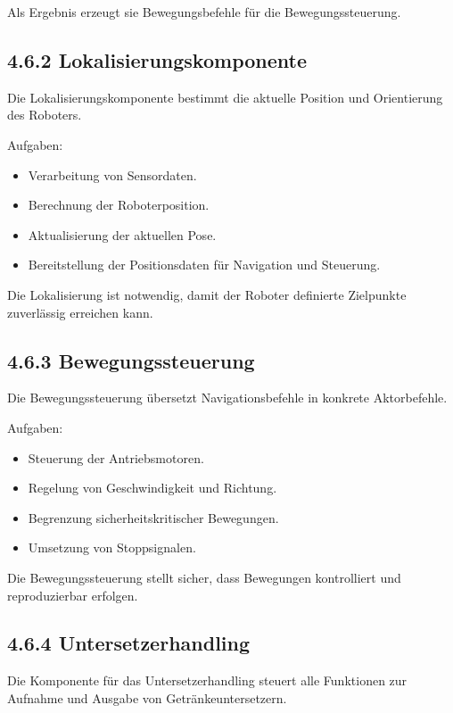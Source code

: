 \documentclass[
]{article}
\providecommand{\tightlist}{%
  \setlength{\itemsep}{0pt}\setlength{\parskip}{0pt}}
\begin{document}
Als Ergebnis erzeugt sie Bewegungsbefehle für die Bewegungssteuerung.

\subsection{4.6.2
Lokalisierungskomponente}\label{lokalisierungskomponente-1}

Die Lokalisierungskomponente bestimmt die aktuelle Position und
Orientierung des Roboters.

Aufgaben:

\begin{itemize}
\tightlist
\item
  Verarbeitung von Sensordaten.
\item
  Berechnung der Roboterposition.
\item
  Aktualisierung der aktuellen Pose.
\item
  Bereitstellung der Positionsdaten für Navigation und Steuerung.
\end{itemize}

Die Lokalisierung ist notwendig, damit der Roboter definierte Zielpunkte
zuverlässig erreichen kann.

\subsection{4.6.3 Bewegungssteuerung}\label{bewegungssteuerung-1}

Die Bewegungssteuerung übersetzt Navigationsbefehle in konkrete
Aktorbefehle.

Aufgaben:

\begin{itemize}
\tightlist
\item
  Steuerung der Antriebsmotoren.
\item
  Regelung von Geschwindigkeit und Richtung.
\item
  Begrenzung sicherheitskritischer Bewegungen.
\item
  Umsetzung von Stoppsignalen.
\end{itemize}

Die Bewegungssteuerung stellt sicher, dass Bewegungen kontrolliert und
reproduzierbar erfolgen.

\subsection{4.6.4 Untersetzerhandling}\label{untersetzerhandling-1}

Die Komponente für das Untersetzerhandling steuert alle Funktionen zur
Aufnahme und Ausgabe von Getränkeuntersetzern.
\end{document}
